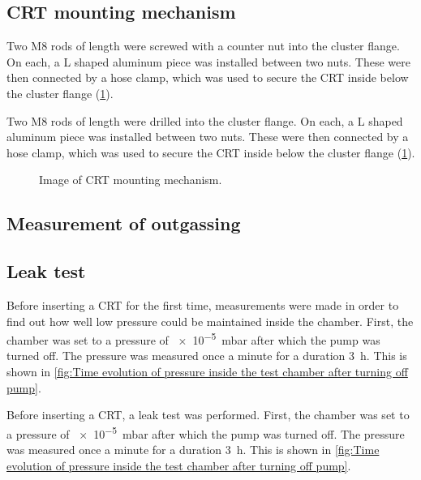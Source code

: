 \subsection{CRT mounting mechanism}
\label{subsec:CRT mounting mechanism}

 Two M8 rods of length  were screwed with a counter nut into the cluster flange. On each, a L shaped aluminum piece was installed between two nuts. These were then connected by a hose clamp, which was used to secure the CRT inside below the cluster flange (\cref{fig:Image of CRT mounting mechanism}).
 
 Two M8 rods of length  were drilled  into the cluster flange. On each, a L shaped aluminum piece was installed between two nuts. These were then connected by a hose clamp, which was used to secure the CRT inside below the cluster flange (\cref{fig:Image of CRT mounting mechanism}).
 

\begin{figure}[h]
	\centering
	
	
	\caption{Image of CRT mounting mechanism.}
	\label{fig:Image of CRT mounting mechanism}
\end{figure}


\subsection{Measurement of outgassing}
\subsection{Leak test} 
\label{subsec:Measurement of outgassing}

Before inserting a CRT for the first time, measurements were made in order to find out how well low pressure could be maintained inside the chamber. First, the chamber was set to a pressure of \SI{e-5}{\milli\bar} after which the pump was turned off. The pressure was measured once a minute for a duration \SI{3}{\hour}. This is shown in \cref{fig:Time evolution of pressure inside the test chamber after turning off pump}.

Before inserting a CRT, a leak test was performed. First, the chamber was set to a pressure of \SI{e-5}{\milli\bar} after which the pump was turned off. The pressure was measured once a minute for a duration \SI{3}{\hour}. This is shown in \cref{fig:Time evolution of pressure inside the test chamber after turning off pump}. 

